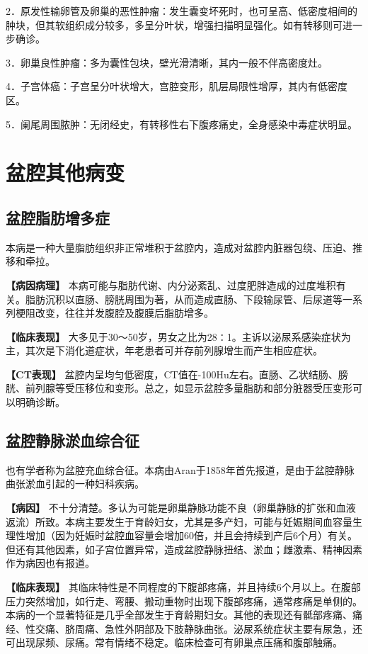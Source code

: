 2．原发性输卵管及卵巢的恶性肿瘤：发生囊变坏死时，也可呈高、低密度相间的肿块，但其软组织成分较多，多呈分叶状，增强扫描明显强化。如有转移则可进一步确诊。

3．卵巢良性肿瘤：多为囊性包块，壁光滑清晰，其内一般不伴高密度灶。

4．子宫体癌：子宫呈分叶状增大，宫腔变形，肌层局限性增厚，其内有低密度区。

5．阑尾周围脓肿：无闭经史，有转移性右下腹疼痛史，全身感染中毒症状明显。

\section{盆腔其他病变}

\subsection{盆腔脂肪增多症}

本病是一种大量脂肪组织非正常堆积于盆腔内，造成对盆腔内脏器包绕、压迫、推移和牵拉。

\textbf{【病因病理】}
本病可能与脂肪代谢、内分泌紊乱、过度肥胖造成的过度堆积有关。脂肪沉积以直肠、膀胱周围为著，从而造成直肠、下段输尿管、后尿道等一系列梗阻改变，往往并发腹腔及腹膜后脂肪增多。

\textbf{【临床表现】}
大多见于30～50岁，男女之比为28∶1。主诉以泌尿系感染症状为主，其次是下消化道症状，年老患者可并存前列腺增生而产生相应症状。

\textbf{【CT表现】}
盆腔内呈均匀低密度，CT值在-100Hu左右。直肠、乙状结肠、膀胱、前列腺等受压移位和变形。总之，如显示盆腔多量脂肪和部分脏器受压变形可以明确诊断。

\subsection{盆腔静脉淤血综合征}

也有学者称为盆腔充血综合征。本病由Aran于1858年首先报道，是由于盆腔静脉曲张淤血引起的一种妇科疾病。

\textbf{【病因】}
不十分清楚。多认为可能是卵巢静脉功能不良（卵巢静脉的扩张和血液返流）所致。本病主要发生于育龄妇女，尤其是多产妇，可能与妊娠期间血容量生理性增加（因为妊娠时盆腔血容量会增加60倍，并且会持续到产后6个月）有关。但还有其他因素，如子宫位置异常，造成盆腔静脉扭结、淤血；雌激素、精神因素作为病因也有报道。

\textbf{【临床表现】}
其临床特性是不同程度的下腹部疼痛，并且持续6个月以上。在腹部压力突然增加，如行走、弯腰、搬动重物时出现下腹部疼痛，通常疼痛是单侧的。本病的一个显著特征是几乎全部发生于育龄期妇女。其他的表现还有骶部疼痛、痛经、性交痛、脐周痛、急性外阴部及下肢静脉曲张。泌尿系统症状主要有尿急，还可出现尿频、尿痛。常有情绪不稳定。临床检查可有卵巢点压痛和腹部触痛。

